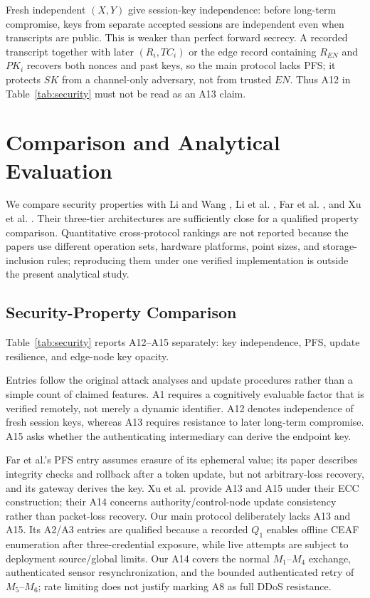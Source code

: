 \documentclass[cmc,article,submit,moreauthors,pdftex]{Definitions/tsp}
\begin{document}
Fresh independent $(X,Y)$ give session-key independence: before long-term compromise, keys from separate accepted sessions are independent even when transcripts are public. This is weaker than perfect forward secrecy. A recorded transcript together with later $(R_i,TC_i)$ or the edge record containing $R_{EN}$ and $PK_i$ recovers both nonces and past keys, so the main protocol lacks PFS; it protects $SK$ from a channel-only adversary, not from trusted $EN$. Thus A12 in Table~\ref{tab:security} must not be read as an A13 claim.

\section{Comparison and Analytical Evaluation}\label{sec:eval}

We compare security properties with Li and Wang \cite{li2019twofactor}, Li et al. \cite{li2018ecc}, Far et al. \cite{far}, and Xu et al. \cite{xu}. Their three-tier architectures are sufficiently close for a qualified property comparison. Quantitative cross-protocol rankings are not reported because the papers use different operation sets, hardware platforms, point sizes, and storage-inclusion rules; reproducing them under one verified implementation is outside the present analytical study.

\subsection{Security-Property Comparison}

Table~\ref{tab:security} reports A12--A15 separately: key independence, PFS, update resilience, and edge-node key opacity.

Entries follow the original attack analyses and update procedures rather than a simple count of claimed features. A1 requires a cognitively evaluable factor that is verified remotely, not merely a dynamic identifier. A12 denotes independence of fresh session keys, whereas A13 requires resistance to later long-term compromise. A15 asks whether the authenticating intermediary can derive the endpoint key.

Far et al.'s PFS entry assumes erasure of its ephemeral value; its paper describes integrity checks and rollback after a token update, but not arbitrary-loss recovery, and its gateway derives the key. Xu et al. provide A13 and A15 under their ECC construction; their A14 concerns authority/control-node update consistency rather than packet-loss recovery. Our main protocol deliberately lacks A13 and A15. Its A2/A3 entries are qualified because a recorded $Q_1$ enables offline CEAF enumeration after three-credential exposure, while live attempts are subject to deployment source/global limits. Our A14 covers the normal $M_1$--$M_4$ exchange, authenticated sensor resynchronization, and the bounded authenticated retry of $M_5$--$M_6$; rate limiting does not justify marking A8 as full DDoS resistance.
\end{document}
